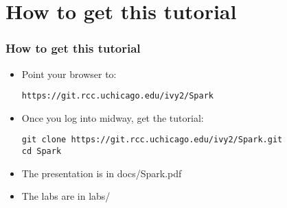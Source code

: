 \section{How to get this tutorial}
\begin{frame}[fragile]
  \frametitle{How to get this tutorial}

  \begin{itemize}
  \item Point your browser to:
    {\color{mycolorcli}
\begin{verbatim}
https://git.rcc.uchicago.edu/ivy2/Spark
\end{verbatim}
    }
  \item Once you log into midway, get the tutorial:
    {\color{mycolorcli}
\begin{verbatim}
git clone https://git.rcc.uchicago.edu/ivy2/Spark.git
cd Spark
\end{verbatim}
    }
  \item The presentation is in {\color{mycolorcli}docs/Spark.pdf}
  \item The labs are in {\color{mycolorcli}labs/}
  \end{itemize}
\end{frame}  